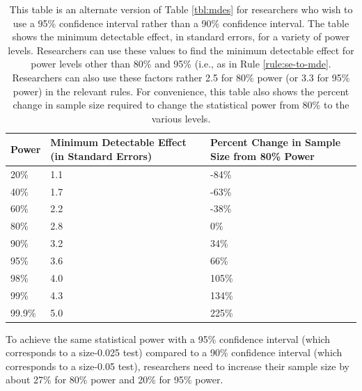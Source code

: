 \documentclass[12pt]{article}
\begin{document}
\begin{table}[h]
\centering
\caption{This table is an alternate version of Table \ref{tbl:mdes} for researchers who wish to use a 95\% confidence interval rather than a 90\% confidence interval. The table shows the minimum detectable effect, in standard errors, for a variety of power levels. Researchers can use these values to find the minimum detectable effect for power levels other than 80\% and 95\% (i.e., as in Rule \ref{rule:se-to-mde}. Researchers can also use these factors rather 2.5 for 80\% power (or 3.3 for 95\% power) in the relevant rules. For convenience, this table also shows the percent change in sample size required to change the statistical power from 80\% to the various levels.}\label{tbl:mdes2}
\footnotesize %
\renewcommand{\tabularxcolumn}[1]{>{\centering\arraybackslash}m{#1}} %
\setlength{\extrarowheight}{4pt} %
\begin{tabularx}{\linewidth}{|X|X|X|} %
\hline
\textbf{Power} & \textbf{Minimum Detectable Effect (in Standard Errors)} & \textbf{Percent Change in Sample Size from 80\% Power} \\
\hline
20\%   & 1.1 & -84\% \\
\hline
40\%   & 1.7 & -63\% \\
\hline
60\%   & 2.2 & -38\% \\
\hline
80\%   & 2.8 & 0\% \\
\hline
90\%   & 3.2 & 34\% \\
\hline
95\%   & 3.6 & 66\% \\
\hline
98\%   & 4.0 & 105\% \\
\hline
99\%   & 4.3 & 134\% \\
\hline
99.9\%  & 5.0 & 225\% \\
\hline
\end{tabularx}
\end{table}

\noindent To achieve the same statistical power with a 95\% confidence interval (which corresponds to a size-0.025 test) compared to a 90\% confidence interval (which corresponds to a size-0.05 test), researchers need to increase their sample size by about 27\% for 80\% power and 20\% for 95\% power.
\end{document}
